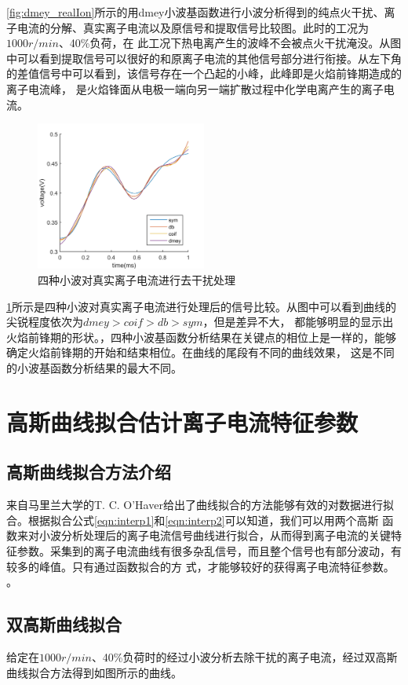 \ref{fig:dmey_realIon}所示的用dmey小波基函数进行小波分析得到的纯点火干扰、离子电流的分解、真实离子电流以及原信号和提取信号比较图。此时的工况为$1000r/min$、40\%负荷，在
此工况下热电离产生的波峰不会被点火干扰淹没。从图中可以看到提取信号可以很好的和原离子电流的其他信号部分进行衔接。从左下角的差值信号中可以看到，该信号存在一个凸起的小峰，此峰即是火焰前锋期造成的离子电流峰，
是火焰锋面从电极一端向另一端扩散过程中化学电离产生的离子电流。
\begin{figure}[!ht]
	\centering
	\includegraphics[width=0.5\textwidth]{thesis_figure/ion_chapter/diff_wv_comp}
	\caption{\label{fig:diff_wv_comp}四种小波对真实离子电流进行去干扰处理}
\end{figure}
\ref{fig:diff_wv_comp}所示是四种小波对真实离子电流进行处理后的信号比较。从图中可以看到曲线的尖锐程度依次为$dmey>coif>db>sym$，但是差异不大，
都能够明显的显示出火焰前锋期的形状。，四种小波基函数分析结果在关键点的相位上是一样的，能够确定火焰前锋期的开始和结束相位。在曲线的尾段有不同的曲线效果，
这是不同的小波基函数分析结果的最大不同。
\section{高斯曲线拟合估计离子电流特征参数}
\subsection{高斯曲线拟合方法介绍}
来自马里兰大学的T. C. O'Haver给出了曲线拟合的方法\cite{tco_gs}能够有效的对数据进行拟合。根据拟合公式\ref{eqn:interp1}和\ref{eqn:interp2}可以知道，我们可以用两个高斯
函数来对小波分析处理后的离子电流信号曲线进行拟合，从而得到离子电流的关键特征参数。采集到的离子电流曲线有很多杂乱信号，而且整个信号也有部分波动，有较多的峰值。只有通过函数拟合的方
式，才能够较好的获得离子电流特征参数。
。
\subsection{双高斯曲线拟合}
给定在$1000r/min$、40\%负荷时的经过小波分析去除干扰的离子电流，经过双高斯曲线拟合方法得到如图所示的曲线。